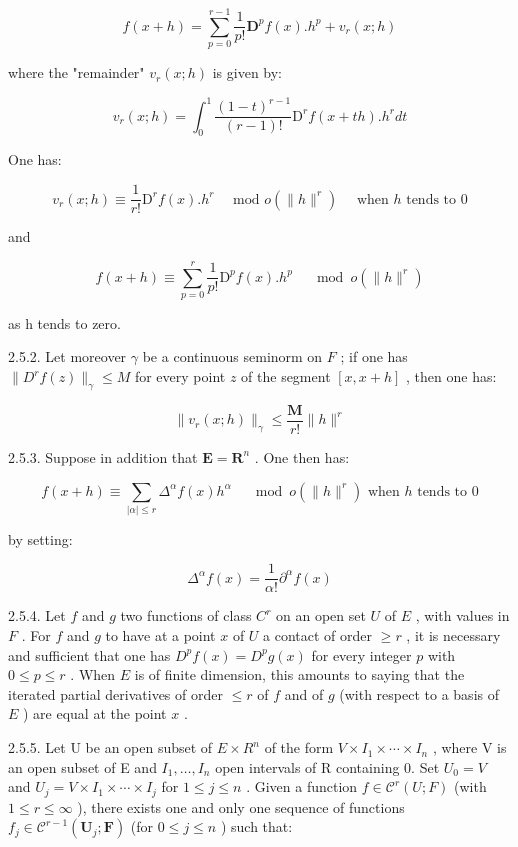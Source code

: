 \[
f (x + h) = \sum_ {p = 0} ^ {r - 1} \frac {1}{p !} \mathbf {D} ^ {p} f (x). h ^ {p} + v _ {r} (x; h)
\]

where the "remainder" \(v_{r}(x; h)\) is given by:

\[
v _ {r} (x; h) = \int_ {0} ^ {1} \frac {(1 - t) ^ {r - 1}}{(r - 1) !} \mathrm{D} ^ {r} f (x + t h). h ^ {r} d t
\]

One has:

\[
v _ {r} (x; h) \equiv \frac {1}{r !} \mathrm{D} ^ {r} f (x). h ^ {r} \quad \text {   mod   } o (\| h \| ^ {r}) \quad \text {   when   } h \text {   tends   to   } 0
\]

and

\[
f (x + h) \equiv \sum_ {p = 0} ^ {r} \frac {1}{p !} \mathrm{D} ^ {p} f (x). h ^ {p} \quad \mod o (\| h \| ^ {r})
\]

as h tends to zero.

2.5.2. Let moreover \(\gamma\) be a continuous seminorm on \(F\) ; if one has \(\|D^{r}f(z)\|_{\gamma}\leqslant M\) for every point \(z\) of the segment \([x,x + h]\) , then one has:

\[
\| v _ {r} (x; h) \| _ {\gamma} \leqslant \frac {\mathbf {M}}{r !} \| h \| ^ {r}
\]

2.5.3. Suppose in addition that \(\mathbf{E} = \mathbf{R}^n\) . One then has:

\[
f (x + h) \equiv \sum_ {| \alpha | \leqslant r} \Delta^ {\alpha} f (x) h ^ {\alpha} \quad \mod o (\| h \| ^ {r}) \text {   when   } h \text {   tends   to   } 0
\]

by setting:

\[
\Delta^ {\alpha} f (x) = \frac {1}{\alpha !} \partial^ {\alpha} f (x)
\]

2.5.4. Let \(f\) and \(g\) two functions of class \(C^r\) on an open set \(U\) of \(E\) , with values in \(F\) . For \(f\) and \(g\) to have at a point \(x\) of \(U\) a contact of order \(\geqslant r\) , it is necessary and sufficient that one has \(D^p f(x) = D^p g(x)\) for every integer \(p\) with \(0 \leqslant p \leqslant r\) . When \(E\) is of finite dimension, this amounts to saying that the iterated partial derivatives of order \(\leqslant r\) of \(f\) and of \(g\) (with respect to a basis of \(E\) ) are equal at the point \(x\) .

2.5.5. Let U be an open subset of \(E \times R^{n}\) of the form \(V \times I_{1} \times \cdots \times I_{n}\) , where V is an open subset of E and \(I_{1}, \ldots, I_{n}\) open intervals of R containing 0. Set \(U_{0} = V\) and \(U_{j} = V \times I_{1} \times \cdots \times I_{j}\) for \(1 \leqslant j \leqslant n\) . Given a function \(f \in \mathcal{C}^{r}(U; F)\) (with \(1 \leqslant r \leqslant \infty\) ), there exists one and only one sequence of functions \(f_{j}\in\mathcal{C}^{r-1}(\mathbf{U}_{j};\mathbf{F})\) (for \(0\leqslant j\leqslant n\) ) such that:

